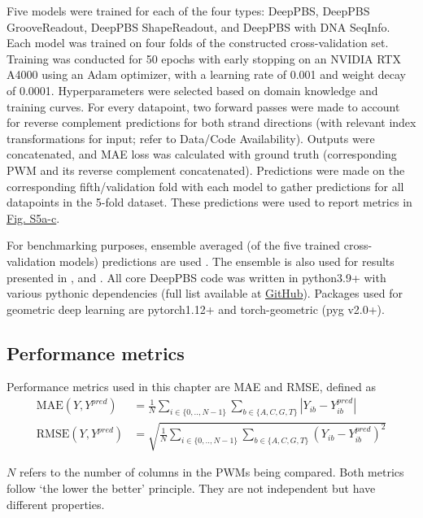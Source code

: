 Five models were trained for each of the four types: DeepPBS, DeepPBS GrooveReadout, DeepPBS ShapeReadout, and DeepPBS with DNA SeqInfo. Each model was trained on four folds of the constructed cross-validation set. Training was conducted for 50 epochs with early stopping on an NVIDIA RTX A4000 using an Adam \citep{Kingma2017} optimizer, with a learning rate of 0.001 and weight decay of 0.0001. Hyperparameters were selected based on domain knowledge and training curves. For every datapoint, two forward passes were made to account for reverse complement predictions for both strand directions (with relevant index transformations for input; refer to Data/Code Availability). Outputs were concatenated, and MAE loss was calculated with ground truth (corresponding PWM and its reverse complement concatenated). Predictions were made on the corresponding fifth/validation fold with each model to gather predictions for all datapoints in the 5-fold dataset. These predictions were used to report metrics in \hyperref[fig:pdnaS5]{Fig. S5a-c}. 

For benchmarking purposes, ensemble averaged (of the five trained cross-validation models) predictions are used . The ensemble is also used for results presented in , and . All core DeepPBS code was written in python3.9+ with various pythonic dependencies (full list available at \href{https://github.com/timkartar/DeepPBS}{GitHub}). Packages used for geometric deep learning are pytorch1.12+ and torch-geometric (pyg v2.0+).

\subsection{Performance metrics}

Performance metrics used in this chapter are MAE and RMSE, defined as 
\begin{align*}
\text{MAE}(Y, Y^{pred}) &= \frac{1}{N} 
\sum\limits_{i\in\{0,..,N-1\}} \sum\limits_{b\in\{A,C,G,T\}} |Y_{ib} - Y_{ib}^{pred}|\\
\text{RMSE}(Y, Y^{pred}) &= \sqrt{\frac{1}{N} \sum\limits_{i\in\{0,..,N-1\}} \sum\limits_{b\in\{A,C,G,T\}} (Y_{ib} - Y_{ib}^{pred})^2}
\end{align*}

$N$ refers to the number of columns in the PWMs being compared. Both metrics follow ‘the lower the better’ principle. They are not independent but have different properties. 

